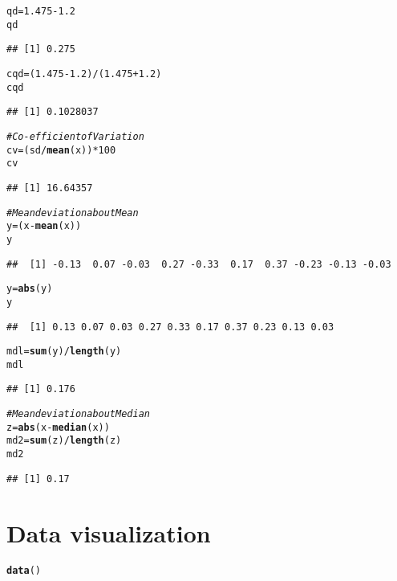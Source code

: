 \documentclass{article}\usepackage[]{graphicx}\usepackage[]{xcolor}
\makeatletter
\newcommand{\hlnum}[1]{\textcolor[rgb]{0.686,0.059,0.569}{#1}}%
\newcommand{\hlcom}[1]{\textcolor[rgb]{0.678,0.584,0.686}{\textit{#1}}}%
\newcommand{\hlopt}[1]{\textcolor[rgb]{0,0,0}{#1}}%
\newcommand{\hldef}[1]{\textcolor[rgb]{0.345,0.345,0.345}{#1}}%
\newcommand{\hlkwb}[1]{\textcolor[rgb]{0.69,0.353,0.396}{#1}}%
\newcommand{\hlkwd}[1]{\textcolor[rgb]{0.737,0.353,0.396}{\textbf{#1}}}%
\newenvironment{kframe}{%
 \def\at@end@of@kframe{}%
 \ifinner\ifhmode%
  \def\at@end@of@kframe{\end{minipage}}%
  \begin{minipage}{\columnwidth}%
 \fi\fi%
 \def\FrameCommand##1{\hskip\@totalleftmargin \hskip-\fboxsep
 \colorbox{shadecolor}{##1}\hskip-\fboxsep
     \hskip-\linewidth \hskip-\@totalleftmargin \hskip\columnwidth}%
 \MakeFramed {\advance\hsize-\width
   \@totalleftmargin\z@ \linewidth\hsize
   \@setminipage}}%
 {\par\unskip\endMakeFramed%
 \at@end@of@kframe}
\newenvironment{knitrout}{}{} %
\makeatother
\begin{document}
\begin{knitrout}
\begin{kframe}
\begin{alltt}
\hldef{qd}\hlkwb{=}\hlnum{1.475}\hlopt{-}\hlnum{1.2}
\hldef{qd}
\end{alltt}
\begin{verbatim}
## [1] 0.275
\end{verbatim}
\begin{alltt}
\hldef{cqd}\hlkwb{=}\hldef{(}\hlnum{1.475}\hlopt{-}\hlnum{1.2}\hldef{)}\hlopt{/}\hldef{(}\hlnum{1.475}\hlopt{+}\hlnum{1.2}\hldef{)}
\hldef{cqd}
\end{alltt}
\begin{verbatim}
## [1] 0.1028037
\end{verbatim}
\begin{alltt}
\hlcom{# Co-efficient of Variation}
\hldef{cv} \hlkwb{=} \hldef{(sd}\hlopt{/}\hlkwd{mean}\hldef{(x))}\hlopt{*}\hlnum{100}
\hldef{cv}
\end{alltt}
\begin{verbatim}
## [1] 16.64357
\end{verbatim}
\begin{alltt}
\hlcom{# Mean deviation about Mean}
\hldef{y}\hlkwb{=}\hldef{(x}\hlopt{-}\hlkwd{mean}\hldef{(x))}
\hldef{y}
\end{alltt}
\begin{verbatim}
##  [1] -0.13  0.07 -0.03  0.27 -0.33  0.17  0.37 -0.23 -0.13 -0.03
\end{verbatim}
\begin{alltt}
\hldef{y}\hlkwb{=}\hlkwd{abs}\hldef{(y)}
\hldef{y}
\end{alltt}
\begin{verbatim}
##  [1] 0.13 0.07 0.03 0.27 0.33 0.17 0.37 0.23 0.13 0.03
\end{verbatim}
\begin{alltt}
\hldef{mdl}\hlkwb{=}\hlkwd{sum}\hldef{(y)}\hlopt{/}\hlkwd{length}\hldef{(y)}
\hldef{mdl}
\end{alltt}
\begin{verbatim}
## [1] 0.176
\end{verbatim}
\begin{alltt}
\hlcom{#Mean deviation about Median}
\hldef{z} \hlkwb{=}\hlkwd{abs}\hldef{(x}\hlopt{-}\hlkwd{median}\hldef{(x))}
\hldef{md2}\hlkwb{=}\hlkwd{sum}\hldef{(z)}\hlopt{/}\hlkwd{length}\hldef{(z)}
\hldef{md2}
\end{alltt}
\begin{verbatim}
## [1] 0.17
\end{verbatim}
\end{kframe}
\end{knitrout}
\section{Data visualization}
\begin{knitrout}
\color{fgcolor}\begin{kframe}
\begin{alltt}
\hlkwd{data}\hldef{()}
\end{alltt}
\end{kframe}
\end{knitrout}
\end{document}
